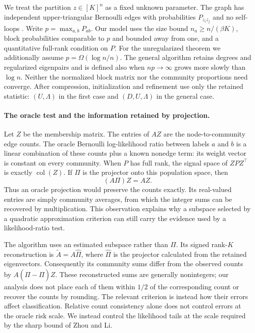 \documentclass[11pt]{article}
\theoremstyle{definition}
\theoremstyle{remark}
\numberwithin{equation}{section}
\begin{document}
We treat the partition $z\in[K]^n$ as a fixed unknown parameter. The graph has independent upper-triangular Bernoulli edges with probabilities $P_{z_i z_j}$ and no self-loops \cite{holland1983}. Write $p=\max_{a,b}P_{ab}$. Our model uses the size bound $n_a\ge n/(\beta K)$, block probabilities comparable to $p$ and bounded away from one, and a quantitative full-rank condition on $P$. For the unregularized theorem we additionally assume $p=\Omega(\log n/n)$. The general algorithm retains degrees and regularized eigenpairs and is defined also when $np\to\infty$ grows more slowly than $\log n$. Neither the normalized block matrix nor the community proportions need converge. After compression, initialization and refinement use only the retained statistic: $(U,\Lambda)$ in the first case and $(D,U,\Lambda)$ in the general case.

\paragraph{The oracle test and the information retained by projection.}
Let $Z$ be the membership matrix. The entries of $AZ$ are the node-to-community edge counts. The oracle Bernoulli log-likelihood ratio between labels $a$ and $b$ is a linear combination of these counts plus a known nonedge term: its weight vector is constant on every community. When $P$ has full rank, the signal space of $ZPZ^\top$ is exactly $\operatorname{col}(Z)$. If $\Pi$ is the projector onto this population space, then
\[
 (A\Pi)Z=AZ.
\]
Thus an oracle projection would preserve the counts exactly. Its real-valued entries are simply community averages, from which the integer sums can be recovered by multiplication. This observation explains why a subspace selected by a quadratic approximation criterion can still carry the evidence used by a likelihood-ratio test.

The algorithm uses an estimated subspace rather than $\Pi$. Its signed rank-$K$ reconstruction is $\widetilde A=A\widehat\Pi$, where $\widehat\Pi$ is the projector calculated from the retained eigenvectors. Consequently its community sums differ from the observed counts by $A(\widehat\Pi-\Pi)Z$. These reconstructed sums are generally nonintegers; our analysis does not place each of them within $1/2$ of the corresponding count or recover the counts by rounding. The relevant criterion is instead how their errors affect classification. Relative count consistency alone does not control errors at the oracle risk scale. We instead control the likelihood tails at the scale required by the sharp bound of Zhou and Li.
\end{document}
